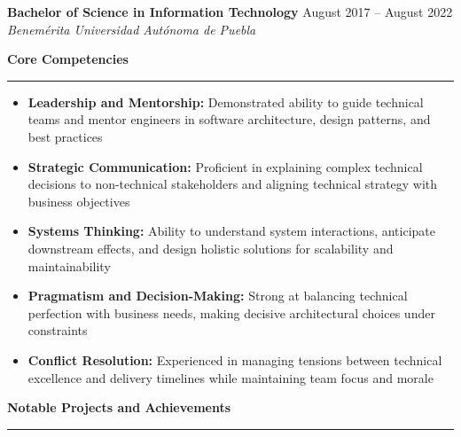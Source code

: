 \documentclass[10pt]{article}
\renewcommand{\section}[1]{%
    \vspace{6pt}
    {\large\bfseries #1}
    \vspace{2pt}
    \hrule
    \vspace{4pt}
}
\newcommand{\entry}[4]{%
    \textbf{#1} \hfill #2\\
    \textit{#3} \hfill #4\\
    \vspace{2pt}
}
\begin{document}
\entry{Bachelor of Science in Information Technology}{August 2017 -- August 2022}{Benemérita Universidad Autónoma de Puebla}{}

\section{Core Competencies}

\begin{itemize}[leftmargin=*]
    \item \textbf{Leadership and Mentorship:} Demonstrated ability to guide technical teams and mentor engineers in software architecture, design patterns, and best practices
    \item \textbf{Strategic Communication:} Proficient in explaining complex technical decisions to non-technical stakeholders and aligning technical strategy with business objectives
    \item \textbf{Systems Thinking:} Ability to understand system interactions, anticipate downstream effects, and design holistic solutions for scalability and maintainability
    \item \textbf{Pragmatism and Decision-Making:} Strong at balancing technical perfection with business needs, making decisive architectural choices under constraints
    \item \textbf{Conflict Resolution:} Experienced in managing tensions between technical excellence and delivery timelines while maintaining team focus and morale
\end{itemize}

\section{Notable Projects and Achievements}
\end{document}
